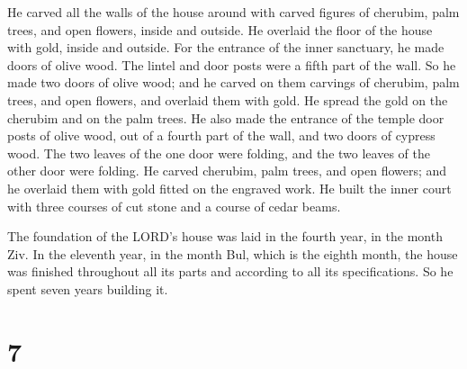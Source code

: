 He carved all the walls of the house around with carved
figures of cherubim, palm trees, and open flowers, inside and outside.
 He overlaid the floor of the house with gold, inside and
outside.  For the entrance of the inner sanctuary, he
made doors of olive wood. The lintel and door posts were a fifth part of
the wall.  So he made two doors of olive wood; and he
carved on them carvings of cherubim, palm trees, and open flowers, and
overlaid them with gold. He spread the gold on the cherubim and on the
palm trees.  He also made the entrance of the temple door
posts of olive wood, out of a fourth part of the wall, 
and two doors of cypress wood. The two leaves of the one door were
folding, and the two leaves of the other door were folding.
 He carved cherubim, palm trees, and open flowers; and he
overlaid them with gold fitted on the engraved work.  He
built the inner court with three courses of cut stone and a course of
cedar beams.

 The foundation of the LORD's house was laid in the
fourth year, in the month Ziv.  In the eleventh year, in
the month Bul, which is the eighth month, the house was finished
throughout all its parts and according to all its specifications. So he
spent seven years building it.

\hypertarget{section-6}{%
\section{7}\label{section-6}}


